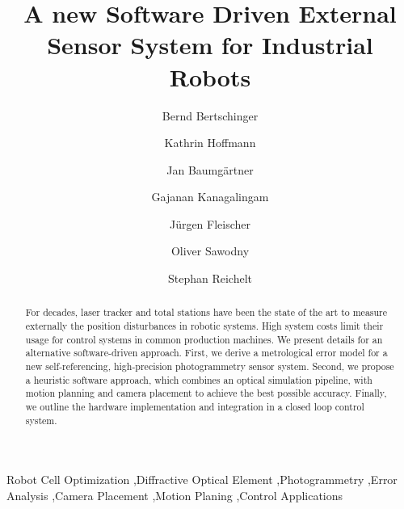 \documentclass[5p,times,procedia]{elsarticle}
\begin{document}
\begin{frontmatter}
%
	\title{A new Software Driven External Sensor System for Industrial Robots}
%	
	\author[a]{Bernd Bertschinger\corref{*}}
	\author[b]{Kathrin Hoffmann}
	\author[c]{Jan Baumgärtner}
	\author[b]{Gajanan Kanagalingam}
	\author[c]{Jürgen Fleischer}
	\author[b]{Oliver Sawodny}
	\author[a]{Stephan Reichelt}
	\address[a]{Institute of Applied Optics, University of Stuttgart - ITO, Pfaffenwaldring 9, 70569 Stuttgart, Germany}
	\address[b]{Institute for System Dynamics, University of Stuttgart - ISYS, Waldburgstr. 17/19, 70563 Stuttgart, Germany}
	\address[c]{Institute of Production Science, Karlsruhe Institute of Technology - WBK, Kaiserstraße 12, 76131 Karlsruhe, Germany}
	
	\begin{abstract}
		For decades, laser tracker and total stations have been the state of the art to measure externally the position disturbances in robotic systems. High system costs limit their usage for control systems in common production machines. We present details for an alternative software-driven approach.
		First, we derive a metrological error model for a new self-referencing, high-precision photogrammetry sensor system. Second, we propose a heuristic software approach, which combines an optical simulation pipeline, with motion planning and camera placement to achieve the best possible accuracy. Finally, we outline the hardware implementation and integration in a closed loop control system.
	\end{abstract}
	
	\begin{keyword}
		Robot Cell Optimization \sep Diffractive Optical Element \sep Photogrammetry \sep Error Analysis \sep Camera Placement \sep	Motion Planing \sep Control Applications
		
	\end{keyword}
\end{frontmatter}
%
\end{document}
